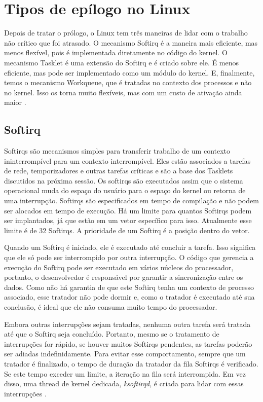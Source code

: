 \section{Tipos de epílogo no Linux}

Depois de tratar o prólogo, o Linux tem três maneiras de lidar com o trabalho não crítico que foi atrasado. O mecanismo Softirq é a maneira mais eficiente, mas menos flexível, pois é implementada diretamente no código do kernel. O mecanismo Tasklet é uma extensão do Softirq e é criado sobre ele. É menos eficiente, mas pode ser implementado como um módulo do kernel. E, finalmente, temos o mecanismo Workqueue, que é tratadas no contexto dos processos e não no kernel. Isso os torna muito flexíveis, mas com um custo de ativação ainda maior \cite{OReilly}.

\subsection{Softirq}

Softirqs são mecanismos simples para transferir trabalho de um contexto ininterrompível para um contexto interrompível. Eles estão associados a tarefas de rede, temporizadores e outras tarefas críticas e são a base dos Tasklets discutidos na próxima sessão. Os softirqs são executados assim que o sistema operacional muda do espaço do usuário para o espaço do kernel ou retorna de uma interrupção. Softirqs são especificados em tempo de compilação e não podem ser alocados em tempo de execução. Há um limite para quantos Softirqs podem ser implantados, já que estão em um vetor específico para isso. Atualmente esse limite é de 32 Softirqs. A prioridade de um Softirq é a posição dentro do vetor.

Quando um Softirq é iniciado, ele é executado até concluir a tarefa. Isso significa que ele só pode ser interrompido por outra interrupção. O código que gerencia a execução do Softirq pode ser executado em vários núcleos do processador, portanto, o desenvolvedor é responsável por garantir a sincronização entre os dados. Como não há garantia de que este Softirq tenha um contexto de processo associado, esse tratador não pode dormir e, como o tratador é executado até sua conclusão, é ideal que ele não consuma muito tempo do processador.

Embora outras interrupções sejam tratadas, nenhuma outra tarefa será tratada até que o Softirq seja concluído. Portanto, mesmo se o tratamento de interrupções for rápido, se houver muitos Softirqs pendentes, as tarefas poderão ser adiadas indefinidamente. Para evitar esse comportamento, sempre que um tratador é finalizado, o tempo de duração da tratador da fila Softirqs é verificado. Se este tempo exceder um limite, a iteração na fila será interrompida. Em vez disso, uma thread de kernel dedicada, \textit{ksoftirqd}, é criada para lidar com essas interrupções \cite{OReilly, Rothberg2015}.

